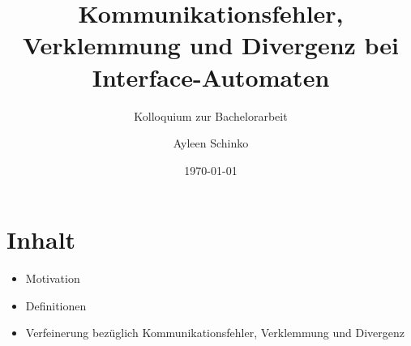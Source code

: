 \documentclass[mathserif]{beamer}
\title{Kommunikationsfehler, Verklemmung und Divergenz bei Interface-Automaten}
\subtitle{Kolloquium zur Bachelorarbeit}
\author{Ayleen Schinko}
\date{\today}
\begin{document}
\maketitle
\section{Inhalt}
\begin{frame}
  \begin{itemize}
      \item Motivation
      \item Definitionen
      \item Verfeinerung bezüglich Kommunikationsfehler, Verklemmung und
        Divergenz
  \end{itemize}
\end{frame}
\end{document}
